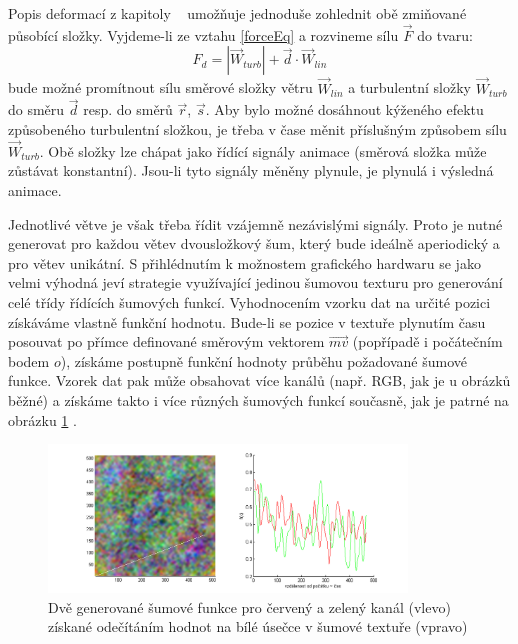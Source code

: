 Popis deformací z kapitoly ~  umožňuje jednoduše zohlednit obě zmiňované působící složky.
Vyjdeme-li ze vztahu \eqref{forceEq} a rozvineme sílu $\vec{F}$ do tvaru:
\begin{equation}
\label{windEq}
F_{d} = \left | \vec{W}_{turb} \right | + \vec{d}\cdot \vec{W}_{lin}
\end{equation}
bude možné promítnout sílu směrové složky větru $\vec{W}_{lin}$ a turbulentní složky $\vec{W}_{turb}$ do směru $\vec{d}$ resp. do směrů $\vec{r}$, $\vec{s}$. Aby bylo možné dosáhnout kýženého efektu způsobeného turbulentní složkou, je třeba v čase měnit příslušným způsobem sílu $\vec{W}_{turb}$. Obě složky lze chápat jako řídící signály animace (směrová složka může zůstávat konstantní). Jsou-li tyto signály měněny plynule, je plynulá i výsledná animace.

Jednotlivé větve je však třeba řídit vzájemně nezávislými signály. Proto je nutné generovat pro každou větev dvousložkový šum, který bude ideálně aperiodický a pro větev unikátní. S přihlédnutím k možnostem grafického hardwaru se jako velmi výhodná jeví strategie využívající jedinou šumovou texturu pro generování celé třídy řídících šumových funkcí. Vyhodnocením vzorku dat na určité pozici získáváme vlastně funkční hodnotu. Bude-li se pozice v textuře plynutím času posouvat po přímce definované směrovým vektorem $\vec{mv}$ (popřípadě i počátečním bodem $o$), získáme postupně funkční hodnoty průběhu požadované šumové funkce. Vzorek dat pak může obsahovat více kanálů (např. RGB, jak je u obrázků běžné) a získáme takto i více různých šumových funkcí současně, jak je patrné na obrázku \ref{fig:noiseFunctions} .
 \begin{figure}[here]
\begin{center}
\includegraphics[width=0.85\textwidth]{./figures/noiseCut1.png}
\end{center}
\caption[Dvě generované šumové funkce]%
{ Dvě generované šumové funkce pro červený a zelený kanál (vlevo) získané odečítáním hodnot na bílé úsečce v šumové textuře (vpravo) \label{fig:noiseFunctions}
}

\end{figure}

